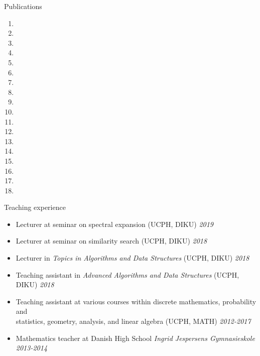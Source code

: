 \documentclass{resume} %
\begin{document}
\begin{rSection}{Publications}

\begin{enumerate}
	\item {}
	\item {}
	\item {}
	\item {}
	\item {}
	\item {}
	\item {}
	\item {}
	\item {}
	\item {}
	\item {}
	\item {}
	\item {}
	\item {}
	\item {}
	\item {}
	\item {}
	\item {}\end{enumerate}
\end{rSection}



\begin{rSection}{Teaching experience}
 \begin{itemize}
 \item Lecturer at seminar on spectral expansion (UCPH, DIKU) \hfill{\emph{2019}}
 \item Lecturer at seminar on similarity search (UCPH, DIKU) \hfill{\emph{2018}}
 \item Lecturer in \emph{Topics in Algorithms and Data Structures} (UCPH, DIKU) \hfill{\emph{2018}}
 \item Teaching assistant in \emph{Advanced Algorithms and Data Structures} (UCPH, DIKU) \hfill{\emph{2018}}
 \item Teaching assistant at various courses within discrete mathematics, probability and \\ statistics, geometry, analysis, and linear algebra (UCPH, MATH) \hfill{\emph{2012-2017}}
 \item Mathematics teacher at Danish High School \emph{Ingrid Jespersens Gymnasieskole} \hfill{\emph{2013-2014}}
 \end{itemize}
 \end{rSection}
\end{document}

